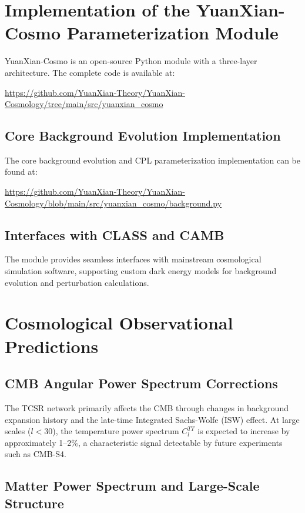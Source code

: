 \documentclass[12pt,a4paper]{article}
\begin{document}
\section{Implementation of the YuanXian-Cosmo Parameterization Module}

YuanXian-Cosmo is an open-source Python module with a three-layer architecture. The complete code is available at:

\url{https://github.com/YuanXian-Theory/YuanXian-Cosmology/tree/main/src/yuanxian_cosmo}

\subsection{Core Background Evolution Implementation}

The core background evolution and CPL parameterization implementation can be found at:

\url{https://github.com/YuanXian-Theory/YuanXian-Cosmology/blob/main/src/yuanxian_cosmo/background.py}

\subsection{Interfaces with CLASS and CAMB}

The module provides seamless interfaces with mainstream cosmological simulation software, supporting custom dark energy models for background evolution and perturbation calculations.

\section{Cosmological Observational Predictions}

\subsection{CMB Angular Power Spectrum Corrections}

The TCSR network primarily affects the CMB through changes in background expansion history and the late-time Integrated Sachs-Wolfe (ISW) effect. At large scales ($l < 30$), the temperature power spectrum $C_l^{TT}$ is expected to increase by approximately 1–2\%, a characteristic signal detectable by future experiments such as CMB-S4.

\subsection{Matter Power Spectrum and Large-Scale Structure}
\end{document}
